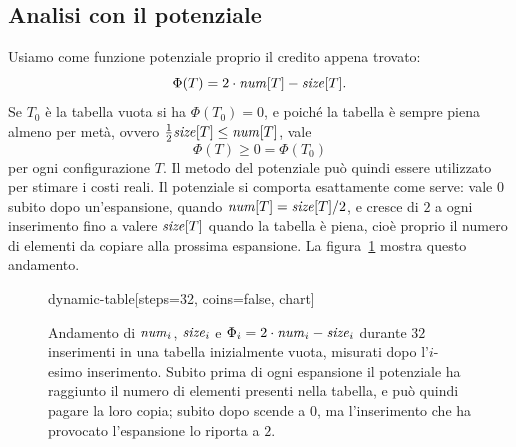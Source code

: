 \subsection{Analisi con il potenziale}
Usiamo come funzione potenziale proprio il credito appena trovato:
\[
\Phi(T) = 2\cdot\mathit{num}[T] - \mathit{size}[T].
\]
Se $T_0$ è la tabella vuota si ha $\Phi(T_0) = 0$, e poiché la tabella è sempre piena almeno per metà, ovvero $\frac{1}{2}\mathit{size}[T] \le \mathit{num}[T]$, vale
\[
\Phi(T) \ge 0 = \Phi(T_0)
\]
per ogni configurazione $T$. Il metodo del potenziale può quindi essere utilizzato per stimare i costi reali. Il potenziale si comporta esattamente come serve: vale $0$ subito dopo un'espansione, quando $\mathit{num}[T] = \mathit{size}[T]/2$, e cresce di $2$ a ogni inserimento fino a valere $\mathit{size}[T]$ quando la tabella è piena, cioè proprio il numero di elementi da copiare alla prossima espansione. La figura~\ref{fig:potenziale-tabella} mostra questo andamento.

\begin{figure}[htbp]
\centering
\begin{widget}{dynamic-table}[steps=32, coins=false, chart]
\end{widget}
\caption{Andamento di $\mathit{num}_i$, $\mathit{size}_i$ e $\Phi_i = 2\cdot\mathit{num}_i - \mathit{size}_i$ durante $32$ inserimenti in una tabella inizialmente vuota, misurati dopo l'$i$-esimo inserimento. Subito prima di ogni espansione il potenziale ha raggiunto il numero di elementi presenti nella tabella, e può quindi pagare la loro copia; subito dopo scende a $0$, ma l'inserimento che ha provocato l'espansione lo riporta a $2$.}
\label{fig:potenziale-tabella}
\end{figure}

